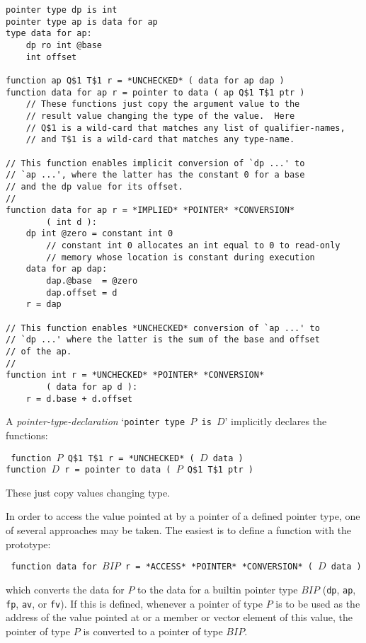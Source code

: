 \documentclass[12pt]{article}
\newenvironment{indpar}[1][0.3in]%
	{\begin{list}{}%
		     {\setlength{\itemsep}{0in}%
		      \setlength{\topsep}{0in}%
		      \setlength{\parsep}{1ex}%
		      \setlength{\labelwidth}{#1}%
		      \setlength{\leftmargin}{#1}%
		      \addtolength{\leftmargin}{\labelsep}}%
	 \item}%
	{\end{list}}
\begin{document}
\begin{indpar}\begin{verbatim}
pointer type dp is int
pointer type ap is data for ap
type data for ap:
    dp ro int @base
    int offset

function ap Q$1 T$1 r = *UNCHECKED* ( data for ap dap )
function data for ap r = pointer to data ( ap Q$1 T$1 ptr )
    // These functions just copy the argument value to the
    // result value changing the type of the value.  Here
    // Q$1 is a wild-card that matches any list of qualifier-names,
    // and T$1 is a wild-card that matches any type-name.

// This function enables implicit conversion of `dp ...' to
// `ap ...', where the latter has the constant 0 for a base
// and the dp value for its offset.
// 
function data for ap r = *IMPLIED* *POINTER* *CONVERSION*
        ( int d ):
    dp int @zero = constant int 0
        // constant int 0 allocates an int equal to 0 to read-only
        // memory whose location is constant during execution
    data for ap dap:
        dap.@base  = @zero
        dap.offset = d
    r = dap

// This function enables *UNCHECKED* conversion of `ap ...' to
// `dp ...' where the latter is the sum of the base and offset
// of the ap.
//
function int r = *UNCHECKED* *POINTER* *CONVERSION*
        ( data for ap d ):
    r = d.base + d.offset
\end{verbatim}\end{indpar}

A {\em pointer-type-declaration} `{\tt pointer type $P$ is $D$}'
implicitly declares the functions:
\begin{indpar} \tt
function $P$ Q\$1 T\$1 r = *UNCHECKED* ( $D$ data ) \\
function $D$ r = pointer to data ( $P$ Q\$1 T\$1 ptr )
\end{indpar}
These just copy values changing type.

In order to access the value pointed at by a pointer of a defined
pointer type, one of several approaches may be taken.  The easiest
is to define a function with the prototype:
\begin{indpar} \tt
function data for $BIP$ r = *ACCESS* *POINTER* *CONVERSION* ( $D$ data )
\end{indpar}
which converts the data for $P$ to the data for a builtin pointer type
$BIP$ ({\tt dp}, {\tt ap}, {\tt fp}, {\tt av}, or {\tt fv}).  If this
is defined, whenever a pointer of type $P$ is to be used as
the address of the value pointed at or a member or vector element
of this value,
the pointer of type $P$ is converted to a pointer of type $BIP$.
\end{document}
